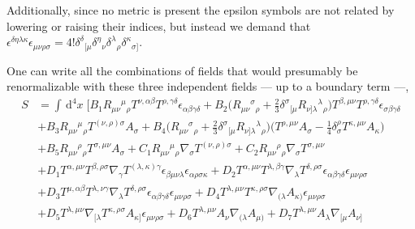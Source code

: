 \documentclass{ws-mpla}
\renewcommand{\(}{\left(}
\renewcommand{\)}{\right)}
\renewcommand{\[}{\left[}
\renewcommand{\]}{\right]}
\newcommand{\dn}[2]{\,{\mathrm{d}}^{#1}\!{#2}\;}
\begin{document}
Additionally, since no metric is present  the epsilon symbols are not related by lowering or raising their indices, but instead we demand that \mbox{$\epsilon^{\delta\eta\lambda\kappa}\epsilon_{\mu\nu\rho\sigma}=4!\delta^{\delta}{}_{[\mu}\delta^\eta{}_{\nu}\delta^{\lambda}{}_{\rho} \delta^\kappa{}_{\sigma]}$.}

One can  write all the combinations of fields that would presumably be renormalizable with these three independent fields --- up to a boundary term ---,
\begin{equation}
  \label{4dfull}
  \begin{split}
      S &= \!\!
      \int\!\!\dn{4}{x}\!\Bigg[
        B_1  R_{\mu\nu}{}^{\mu}{}_{\rho} T^{\nu,\alpha\beta}T^{\rho,\gamma\delta}\epsilon_{\alpha\beta\gamma\delta}
        +B_2 \Big( R_{\mu\nu}{}^{\sigma}{}_\rho+\tfrac{2}{3}\delta^\sigma{}_{[\mu} R_{\nu]\lambda}{}^{\lambda}{}_\rho \Big) T^{\beta,\mu\nu}T^{\rho,\gamma\delta}\epsilon_{\sigma\beta\gamma\delta}
        \\ 
        & +B_3  R_{\mu\nu}{}^{\mu}{}_{\rho} T^{(\nu,\rho)\sigma}A_\sigma
        + B_4\Big( R_{\mu\nu}{}^{\sigma}{}_\rho+\tfrac{2}{3}\delta^\sigma{}_{[\mu} R_{\nu]\lambda}{}^{\lambda}{}_\rho \Big)\Big(T^{\rho,\mu\nu}A_\sigma-\tfrac{1}{4}\delta^\rho_\sigma T^{\kappa,\mu\nu}A_\kappa\Big)
        \\
        & +B_5 R_{\mu\nu}{}^{\rho}{}_\rho T^{\sigma,\mu\nu}A_\sigma
        +C_1  R_{\mu\nu}{}^{\mu}{}_{\rho} \nabla_\sigma T^{(\nu,\rho)\sigma}
        +C_2 R_{\mu\nu}{}^{\rho}{}_\rho \nabla_\sigma T^{\sigma,\mu\nu} 
        \\
        & +D_1T^{\alpha,\mu\nu}T^{\beta,\rho\sigma}\nabla_\gamma T^{(\lambda, \kappa) \gamma}\epsilon_{\beta\mu\nu\lambda}\epsilon_{\alpha\rho\sigma\kappa}
        +D_2T^{\alpha,\mu\nu}T^{\lambda,\beta\gamma}\nabla_\lambda T^{\delta,\rho\sigma}\epsilon_{\alpha\beta\gamma\delta}\epsilon_{\mu\nu\rho\sigma}
        \\
        & +D_3T^{\mu,\alpha\beta}T^{\lambda,\nu\gamma}\nabla_\lambda T^{\delta,\rho\sigma}\epsilon_{\alpha\beta\gamma\delta}\epsilon_{\mu\nu\rho\sigma}
        +D_4T^{\lambda,\mu\nu}T^{\kappa,\rho\sigma}\nabla_{(\lambda} A_{\kappa)} \epsilon_{\mu\nu\rho\sigma}
        \\
        & +D_5T^{\lambda,\mu\nu}\nabla_{[\lambda}T^{\kappa,\rho\sigma} A_{\kappa]} \epsilon_{\mu\nu\rho\sigma}
        +D_6T^{\lambda,\mu\nu}A_\nu\nabla_{(\lambda} A_{\mu)}
        +D_7T^{\lambda,\mu\nu}A_\lambda\nabla_{[\mu} A_{\nu]} 
        \\

\end{split}
\end{equation}
\end{document}
